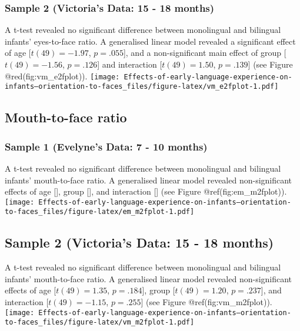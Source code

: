 \documentclass[english,man,floatsintext]{apa6}
\begin{document}
\hypertarget{sample-2-victorias-data-15---18-months-3}{%
\subsubsection{Sample 2 (Victoria's Data: 15 - 18 months)}\label{sample-2-victorias-data-15---18-months-3}}

A t-test revealed no significant difference between monolingual and bilingual infants' eyes-to-face ratio. A generalised linear model revealed a significant effect of age {[}\(t(49) = -1.97\), \(p = .055\){]}, and a non-significant main effect of group {[}\(t(49) = -1.56\), \(p = .126\){]} and interaction {[}\(t(49) = 1.50\), \(p = .139\){]} (see Figure @red(fig:vm\_e2fplot)).
\texttt{[image: Effects-of-early-language-experience-on-infants--orientation-to-faces\_files/figure-latex/vm\_e2fplot-1.pdf]}

\hypertarget{mouth-to-face-ratio}{%
\subsection{Mouth-to-face ratio}\label{mouth-to-face-ratio}}

\hypertarget{sample-1-evelynes-data-7---10-months-4}{%
\subsubsection{Sample 1 (Evelyne's Data: 7 - 10 months)}\label{sample-1-evelynes-data-7---10-months-4}}

A t-test revealed no significant difference between monolingual and bilingual infants' mouth-to-face ratio. A generalised linear model revealed non-significant effects of age {[}{]}, group {[}{]}, and interaction {[}{]} (see Figure @ref(fig:em\_m2fplot)).
\texttt{[image: Effects-of-early-language-experience-on-infants--orientation-to-faces\_files/figure-latex/em\_m2fplot-1.pdf]}

\hypertarget{sample-2-victorias-data-15---18-months-4}{%
\subsection{Sample 2 (Victoria's Data: 15 - 18 months)}\label{sample-2-victorias-data-15---18-months-4}}

A t-test revealed no significant difference between monolingual and bilingual infants' mouth-to-face ratio. A generalised linear model revealed non-significant effects of age {[}\(t(49) = 1.35\), \(p = .184\){]}, group {[}\(t(49) = 1.20\), \(p = .237\){]}, and interaction {[}\(t(49) = -1.15\), \(p = .255\){]} (see Figure @ref(fig:vm\_m2fplot)).
\texttt{[image: Effects-of-early-language-experience-on-infants--orientation-to-faces\_files/figure-latex/vm\_m2fplot-1.pdf]}
\end{document}
